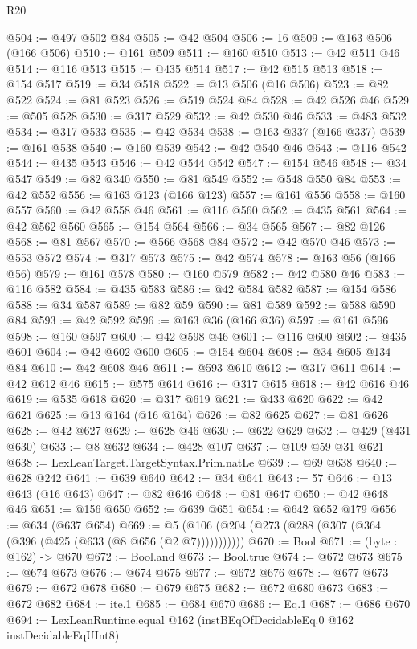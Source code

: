 \begin{lexlean}{R20}
\begin{coremodule}
@504 := @497 @502 @84
@505 := @42 @504
@506 := 16
@509 := @163 @506 (@166 @506)
@510 := @161 @509
@511 := @160 @510
@513 := @42 @511 @46
@514 := @116 @513
@515 := @435 @514
@517 := @42 @515 @513
@518 := @154 @517
@519 := @34 @518
@522 := @13 @506 (@16 @506)
@523 := @82 @522
@524 := @81 @523
@526 := @519 @524 @84
@528 := @42 @526 @46
@529 := @505 @528
@530 := @317 @529
@532 := @42 @530 @46
@533 := @483 @532
@534 := @317 @533
@535 := @42 @534
@538 := @163 @337 (@166 @337)
@539 := @161 @538
@540 := @160 @539
@542 := @42 @540 @46
@543 := @116 @542
@544 := @435 @543
@546 := @42 @544 @542
@547 := @154 @546
@548 := @34 @547
@549 := @82 @340
@550 := @81 @549
@552 := @548 @550 @84
@553 := @42 @552
@556 := @163 @123 (@166 @123)
@557 := @161 @556
@558 := @160 @557
@560 := @42 @558 @46
@561 := @116 @560
@562 := @435 @561
@564 := @42 @562 @560
@565 := @154 @564
@566 := @34 @565
@567 := @82 @126
@568 := @81 @567
@570 := @566 @568 @84
@572 := @42 @570 @46
@573 := @553 @572
@574 := @317 @573
@575 := @42 @574
@578 := @163 @56 (@166 @56)
@579 := @161 @578
@580 := @160 @579
@582 := @42 @580 @46
@583 := @116 @582
@584 := @435 @583
@586 := @42 @584 @582
@587 := @154 @586
@588 := @34 @587
@589 := @82 @59
@590 := @81 @589
@592 := @588 @590 @84
@593 := @42 @592
@596 := @163 @36 (@166 @36)
@597 := @161 @596
@598 := @160 @597
@600 := @42 @598 @46
@601 := @116 @600
@602 := @435 @601
@604 := @42 @602 @600
@605 := @154 @604
@608 := @34 @605 @134 @84
@610 := @42 @608 @46
@611 := @593 @610
@612 := @317 @611
@614 := @42 @612 @46
@615 := @575 @614
@616 := @317 @615
@618 := @42 @616 @46
@619 := @535 @618
@620 := @317 @619
@621 := @433 @620
@622 := @42 @621
@625 := @13 @164 (@16 @164)
@626 := @82 @625
@627 := @81 @626
@628 := @42 @627
@629 := @628 @46
@630 := @622 @629
@632 := @429 (@431 @630)
@633 := @8 @632
@634 := @428 @107
@637 := @109 @59 @31 @621
@638 := LexLeanTarget.TargetSyntax.Prim.natLe
@639 := @69 @638
@640 := @628 @242
@641 := @639 @640
@642 := @34 @641
@643 := 57
@646 := @13 @643 (@16 @643)
@647 := @82 @646
@648 := @81 @647
@650 := @42 @648 @46
@651 := @156 @650
@652 := @639 @651
@654 := @642 @652 @179
@656 := @634 (@637 @654)
@669 := @5 (@106 (@204 (@273 (@288 (@307 (@364 (@396 (@425 (@633 (@8 @656 (@2 @7)))))))))))
@670 := Bool
@671 := (byte : @162) -> @670
@672 := Bool.and
@673 := Bool.true
@674 := @672 @673
@675 := @674 @673
@676 := @674 @675
@677 := @672 @676
@678 := @677 @673
@679 := @672 @678
@680 := @679 @675
@682 := @672 @680 @673
@683 := @672 @682
@684 := ite.{1}
@685 := @684 @670
@686 := Eq.{1}
@687 := @686 @670
@694 := LexLeanRuntime.equal @162 (instBEqOfDecidableEq.{0} @162 instDecidableEqUInt8)

\end{coremodule}
\end{lexlean}
